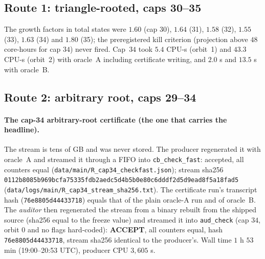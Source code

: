 \documentclass[10pt]{article}
\begin{document}
\subsection{Route 1: triangle-rooted, caps 30--35}
\begin{table}[h]\centering\scriptsize\setlength{\tabcolsep}{3pt}
\resizebox{\linewidth}{!}{}
\caption{Route~1. Every row: oracle~B hash equal to oracle~A, certificate accepted by the producer's Python checker and by \texttt{aud\_check} (the 12 certificates are listed in the appendix). Cap~$35$ (order $70$) covers only the girth-$6$ part and is \emph{not} a statement about order $70$: the three $(3,10)$-cages lie outside the triangle-rooted search.}\label{tab:r1}
\end{table}
The growth factors in total states were $1.60$ (cap 30), $1.64$ (31), $1.58$ (32), $1.55$ (33), $1.63$ (34) and $1.80$ (35); the preregistered kill criterion (projection above $48$ core-hours for cap $34$) never fired. Cap~$34$ took $5.4$ CPU-s (orbit~1) and $43.3$ CPU-s (orbit~2) with oracle~A including certificate writing, and $2.0$ s and $13.5$ s with oracle~B.
\subsection{Route 2: arbitrary root, caps 29--34}
\begin{table}[h]\centering\scriptsize\setlength{\tabcolsep}{3pt}
\resizebox{\linewidth}{!}{}
\caption{Route~2 (no triangle assumed, no premise). Single-core CPU-s without a certificate, oracle A / oracle B (producer): cap 29: 5.3 / 29.5; 30: 11.2 / 59.4; 31: 20.5 / 121.9; 32: 39.1 / 246.6; 33: 75.3 / 505.6; 34: 149.8 / 1062.8. For caps 33--34 the auditor's rebuilt-binary comparison was not run in this table form; the cap-34 certificate run of the producer's binary (hash \texttt{76e8805d44433718}) is in \texttt{data/audit/out/r34\_certrun.json}.}\label{tab:r2}
\end{table}
\paragraph{The cap-34 arbitrary-root certificate (the one that carries the headline).}
The stream is tens of GB and was never stored. The producer regenerated it with oracle~A and streamed it through a FIFO into \texttt{cb\_check\_fast}: accepted, all counters equal (\texttt{data/main/R\_cap34\_checkfast.json}); stream sha256 \texttt{0112b8085b969bcfa75335fdb2aedc5d4b5b0e80c6dddf2d5d9ead8f5a18fad5} (\texttt{data/logs/main/R\_cap34\_stream\_sha256.txt}). The certificate run's transcript hash (\texttt{76e8805d44433718}) equals that of the plain oracle-A run and of oracle~B. The \emph{auditor} then regenerated the stream from a binary rebuilt from the shipped source (sha256 equal to the freeze value) and streamed it into \texttt{aud\_check} (cap $34$, orbit $0$ and no flags hard-coded): \textbf{ACCEPT}, all counters equal, hash \texttt{76e8805d44433718}, stream sha256 identical to the producer's. Wall time $1$ h $53$ min (19:00--20:53 UTC), producer CPU $3{,}605$ s.
\end{document}
